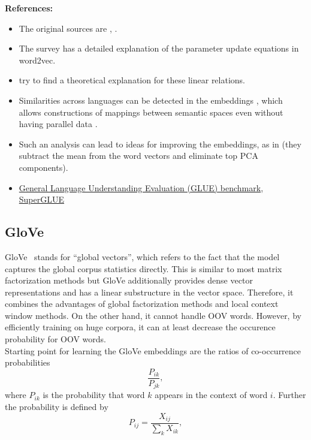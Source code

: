 \documentclass[11pt, a4paper]{amsart}
\begin{document}
\textbf{References:}
\begin{itemize}
	\item The original sources are
	\cite{DBLP:journals/corr/abs-1301-3781},
	\cite{DBLP:journals/corr/MikolovSCCD13}.
	\item The survey \cite{DBLP:journals/corr/Rong14} has a detailed explanation of the parameter update equations in word2vec.
    \item \cite{DBLP:journals/corr/abs-1901-09813} try to find a theoretical explanation for these linear relations.
    \item Similarities across languages can be detected in the embeddings \cite{DBLP:journals/corr/MikolovLS13}, which allows constructions of mappings between semantic spaces even without having parallel data \cite{DBLP:journals/corr/abs-1710-04087}.
    \item Such an analysis can lead to ideas for improving the embeddings, as in \cite{DBLP:journals/corr/MuBV17} (they subtract the mean from the word vectors and eliminate top PCA components).
    \item \href{https://gluebenchmark.com/}{General Language Understanding Evaluation (GLUE) benchmark}, \href{https://super.gluebenchmark.com/}{SuperGLUE}
\end{itemize}

\subsection{GloVe}

GloVe~\cite{pennington-etal-2014-glove} stands for ``global vectors'', which refers to the fact that the model captures the global corpus statistics directly. This is similar to most matrix factorization methods but GloVe additionally provides dense vector representations and has a linear substructure in the vector space. Therefore, it combines the advantages of global factorization methods and local context window methods. On the other hand, it cannot handle OOV words. However, by efficiently training on huge corpora, it can at least decrease the occurence probability for OOV words. \\

Starting point for learning the GloVe embeddings are the ratios of co-occurrence probabilities
\begin{equation}
	\frac{P_{ik}}{P_{jk}},
\end{equation}
where $P_{ik}$ is the probability that word $k$ appears in the context of word $i$. Further the probability is defined by
\begin{equation}
	P_{ij} = \frac{X_{ij}}{\sum_{k} X_{ik}},
\end{equation}
\end{document}
